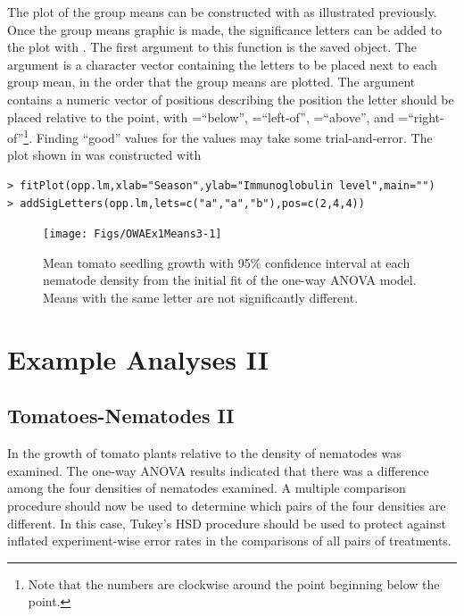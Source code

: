 \documentclass[10pt,openany]{book}\usepackage[]{graphicx}\usepackage[]{color}
\makeatletter
\newenvironment{kframe}{%
 \def\at@end@of@kframe{}%
 \ifinner\ifhmode%
  \def\at@end@of@kframe{\end{minipage}}%
  \begin{minipage}{\columnwidth}%
 \fi\fi%
 \def\FrameCommand##1{\hskip\@totalleftmargin \hskip-\fboxsep
 \colorbox{shadecolor}{##1}\hskip-\fboxsep
     \hskip-\linewidth \hskip-\@totalleftmargin \hskip\columnwidth}%
 \MakeFramed {\advance\hsize-\width
   \@totalleftmargin\z@ \linewidth\hsize
   \@setminipage}}%
 {\par\unskip\endMakeFramed%
 \at@end@of@kframe}
\newenvironment{knitrout}{}{} %
\makeatother
\begin{document}
The plot of the group means can be constructed with  as illustrated previously.  Once the group means graphic is made, the significance letters can be added to the plot with .  The first argument to this function is the saved  object.  The  argument is a character vector containing the letters to be placed next to each group mean, in the order that the group means are plotted.  The  argument contains a numeric vector of positions describing the position the letter should be placed relative to the point, with =``below'', =``left-of'', =``above'', and =``right-of''\footnote{Note that the numbers are clockwise around the point beginning below the point.}.  Finding ``good'' values for the  values may take some trial-and-error.  The plot shown in  was constructed with

\begin{knitrout}
\color{fgcolor}\begin{kframe}
\begin{verbatim}
> fitPlot(opp.lm,xlab="Season",ylab="Immunoglobulin level",main="")
> addSigLetters(opp.lm,lets=c("a","a","b"),pos=c(2,4,4))
\end{verbatim}
\end{kframe}\begin{figure}[hbtp]

{\centering \texttt{[image: Figs/OWAEx1Means3-1]} 

}

\caption[Mean tomato seedling growth with 95\% confidence interval at each nematode density from the initial fit of the one-way ANOVA model]{Mean tomato seedling growth with 95\% confidence interval at each nematode density from the initial fit of the one-way ANOVA model.  Means with the same letter are not significantly different.}\label{fig:OWAEx1Means3}
\end{figure}


\end{knitrout}

\section{Example Analyses II}
\subsection{Tomatoes-Nematodes II}
In  the growth of tomato plants relative to the density of nematodes was examined.  The one-way ANOVA results indicated that there was a difference among the four densities of nematodes examined.  A multiple comparison procedure should now be used to determine which pairs of the four densities are different.  In this case, Tukey's HSD procedure should be used to protect against inflated experiment-wise error rates in the comparisons of all pairs of treatments.
\end{document}
